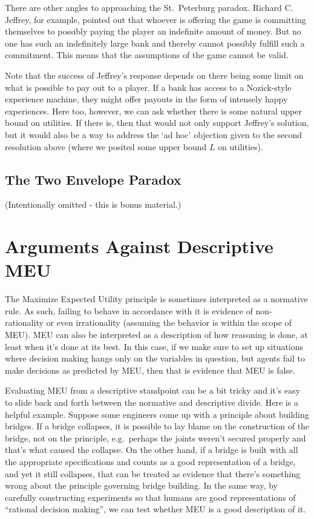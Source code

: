 \documentclass[]{tufte-book}
\begin{document}
There are other angles to approaching the St.~Peterburg paradox. Richard C. Jeffrey, for example, pointed out that whoever is offering the game is committing themselves to possibly paying the player an indefinite amount of money. But no one has such an indefinitely large bank and thereby cannot possibly fulfill such a commitment. This means that the assumptions of the game cannot be valid.

Note that the success of Jeffrey's response depends on there being some limit on what is possible to pay out to a player. If a bank has access to a Nozick-style experience machine, they might offer payouts in the form of intensely happy experiences. Here too, however, we can ask whether there is some natural upper bound on utilities. If there is, then that would not only support Jeffrey's solution, but it would also be a way to address the `ad hoc' objection given to the second resolution above (where we posited some upper bound \(L\) on utilities).

\hypertarget{the-two-envelope-paradox}{%
\subsection{The Two Envelope Paradox}\label{the-two-envelope-paradox}}

(Intentionally omitted - this is bonus material.)

\hypertarget{arguments-against-descriptive-meu}{%
\section{Arguments Against Descriptive MEU}\label{arguments-against-descriptive-meu}}

The Maximize Expected Utility principle is sometimes interpreted as a normative rule. As such, failing to behave in accordance with it is evidence of non-rationality or even irrationality (assuming the behavior is within the scope of MEU). MEU can also be interpreted as a description of how reasoning is done, at least when it's done at its best. In this case, if we make sure to set up situations where decision making hangs only on the variables in question, but agents fail to make decisions as predicted by MEU, then that is evidence that MEU is false.

Evaluating MEU from a descriptive standpoint can be a bit tricky and it's easy to slide back and forth between the normative and descriptive divide. Here is a helpful example. Suppose some engineers come up with a principle about building bridges. If a bridge collapses, it is possible to lay blame on the construction of the bridge, not on the principle, e.g.~perhaps the joints weren't secured properly and that's what caused the collapse. On the other hand, if a bridge is built with all the appropriate specifications and counts as a good representation of a bridge, and yet it still collapses, that can be treated as evidence that there's something wrong about the principle governing bridge building. In the same way, by carefully constructing experiments so that humans are good representations of ``rational decision making'', we can test whether MEU is a good description of it.
\end{document}
